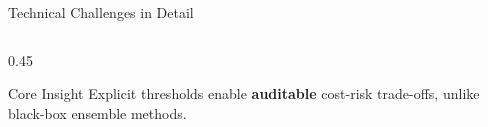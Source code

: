 \documentclass[aspectratio=169,12pt]{beamer}
\newcommand{\highlight}[1]{\textcolor{primaryblue}{\textbf{#1}}}
\begin{document}
\begin{frame}{Technical Challenges in Detail}
\begin{columns}[T]
\begin{column}{0.45\textwidth}
\begin{center}
\end{center}

\vspace{0.3em}
\begin{block}{Core Insight}
Explicit thresholds enable \highlight{auditable} cost-risk trade-offs, unlike black-box ensemble methods.
\end{block}
\end{column}
\end{columns}
\end{frame}

\end{document}
